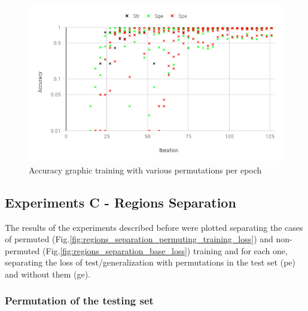 \begin{enumerate}[label=(\Alph*)]
        \begin{figure}[H]
            \centering
            \includegraphics[width=.9\linewidth]{fig/content/results/shortest_path/various_perms_per_epoch_ACC.png}
            \caption{Accuracy graphic training with various permutations per epoch}
            \label{fig:shotest_paths_varios_perms_ACC_results}
        \end{figure}

    \end{enumerate}
    
\subsection{Experiments C - Regions Separation}

The results of the experiments described before were plotted separating the cases of permuted (Fig.\ref{fig:regions_separation_permuting_training_loss}) and non-permuted (Fig.\ref{fig:regions_separation_base_loss}) training and for each one, separating the loss of test/generalization with permutations in the test set (pe) and without them (ge).

\subsubsection {Permutation of the testing set}

